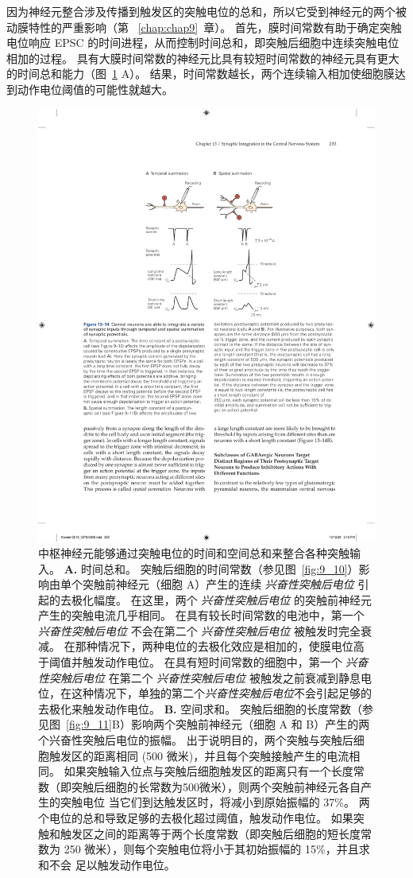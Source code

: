 因为神经元整合涉及传播到触发区的突触电位的总和，所以它受到神经元的两个被动膜特性的严重影响（第  ~\ref{chap:chap9}~章）。
首先，膜时间常数有助于确定突触电位响应 EPSC 的时间进程，从而控制时间总和，即突触后细胞中连续突触电位相加的过程。
具有大膜时间常数的神经元比具有较短时间常数的神经元具有更大的时间总和能力（图~\ref{fig:13_14} A）。
结果，时间常数越长，两个连续输入相加使细胞膜达到动作电位阈值的可能性就越大。


\begin{figure}[htbp]
	\centering
	\includegraphics[width=0.6\linewidth]{chap13/fig_13_14}
	\caption{中枢神经元能够通过突触电位的时间和空间总和来整合各种突触输入。
		\textbf{A.} 时间总和。
		突触后细胞的时间常数（参见图~\ref{fig:9_10}）影响由单个突触前神经元（细胞 A）产生的连续 \textit{兴奋性突触后电位} 引起的去极化幅度。
		在这里，两个 \textit{兴奋性突触后电位} 的突触前神经元产生的突触电流几乎相同。
		在具有较长时间常数的电池中，第一个 \textit{兴奋性突触后电位} 不会在第二个 \textit{兴奋性突触后电位} 被触发时完全衰减。
		在那种情况下，两种电位的去极化效应是相加的，使膜电位高于阈值并触发动作电位。
		在具有短时间常数的细胞中，第一个 \textit{兴奋性突触后电位} 在第二个 \textit{兴奋性突触后电位} 被触发之前衰减到静息电位，在这种情况下，单独的第二个\textit{兴奋性突触后电位}不会引起足够的去极化来触发动作电位。
		\textbf{B.} 空间求和。
		突触后细胞的长度常数（参见图~\ref{fig:9_11}B）影响两个突触前神经元（细胞 A 和 B）产生的两个兴奋性突触后电位的振幅。
		出于说明目的，两个突触与突触后细胞触发区的距离相同 (500 微米)，并且每个突触接触产生的电流相同。
		如果突触输入位点与突触后细胞触发区的距离只有一个长度常数（即突触后细胞的长常数为500微米），则两个突触前神经元各自产生的突触电位 当它们到达触发区时，将减小到原始振幅的 37\%。
		两个电位的总和导致足够的去极化超过阈值，触发动作电位。
		如果突触和触发区之间的距离等于两个长度常数（即突触后细胞的短长度常数为 250 微米），则每个突触电位将小于其初始振幅的 15\%，并且求和不会 足以触发动作电位。}
	\label{fig:13_14}
\end{figure}


